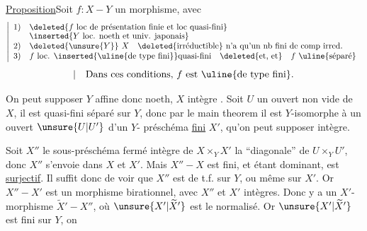 \uline{Proposition}\quad Soit $f:X-Y$ un morphisme, avec
\[
\left|
\begin{array}{ll}
1)&\deleted{f\text{ loc de présentation finie et loc quasi-fini}}\\[-.3ex]
 &\inserted{Y\text{ loc. noeth et univ. japonais}}\\
2)&\deleted{\unsure{Y}}\ X\quad\deleted{\text{irréductible}}\ 
\text{n'a qu'un nb fini de comp irred.}\\
3)&f\text{ loc. }\inserted{\uline{\text{de type fini}}}
\text{quasi-fini}\quad\deleted{\text{et, et}}\quad f\ \uline{\text{séparé}}
\end{array}
\right.
\]
\[
\left|\quad\text{Dans ces conditions, }f\text{ est \uline{de type fini}.}\right.
\]

On peut supposer $Y$ affine donc noeth, \unsure{\&}
$X$ intègre 
.
Soit $U$ un ouvert  non vide de $X$, il est
quasi-fini séparé sur $Y$, donc par le main theorem il est
$Y$-isomorphe à un ouvert $\unsure{U|U'}$ d'un $Y$-
préschéma \uline{fini} $X'$, qu'on peut supposer intègre.


Soit $X''$ le sous-préschéma fermé intègre de $X\times_YX'$
la ``diagonale'' de $U\times_YU'$, donc $X''$ s'envoie dans $X$ et $X'$.
Mais $X''-X$ est fini, et étant dominant, est \uline{surjectif}.
Il suffit donc de voir que $X''$ est de t.f. sur $Y$, ou même sur $X'$.
Or $X''-X'$ est un morphisme birationnel, avec $X''$ et $X'$ intègres.
Donc \deleted{\unsure{il}} y a un $X'$-morphisme
 $\widetilde X'-X''$, où $\unsure{X'|\widetilde X'}$
est le normalisé. Or $\unsure{X'|\widetilde X'}$ est fini sur $Y$,
on \unsure{gagne} \unsure{.....}
